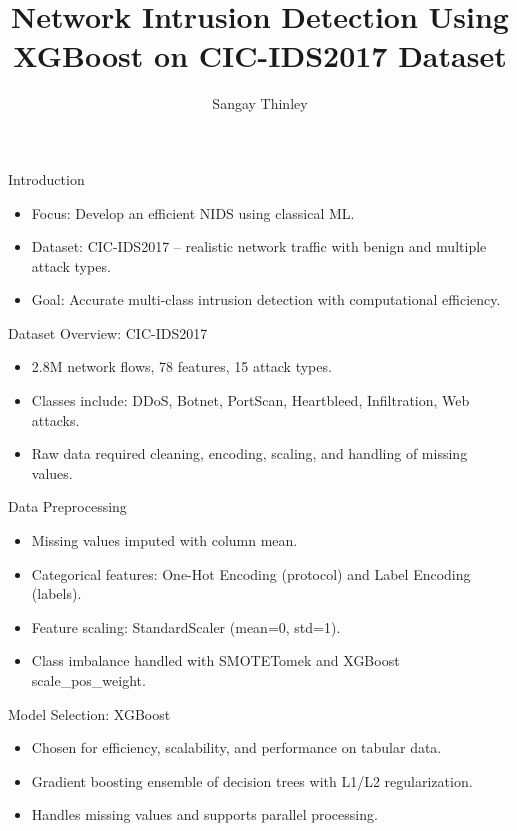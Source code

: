 \documentclass{beamer}
\title{Network Intrusion Detection Using XGBoost on CIC-IDS2017 Dataset}
\author{Sangay Thinley}
\institute{School of Built Environment, Engineering and Computing\\ Leeds Beckett University}
\date{}
\begin{document}
\frame{\titlepage}

\begin{frame}{Introduction}
\begin{itemize}
    \item Focus: Develop an efficient NIDS using classical ML.
    \item Dataset: CIC-IDS2017 – realistic network traffic with benign and multiple attack types.
    \item Goal: Accurate multi-class intrusion detection with computational efficiency.
\end{itemize}
\end{frame}

\begin{frame}{Dataset Overview: CIC-IDS2017}
\begin{itemize}
    \item 2.8M network flows, 78 features, 15 attack types.
    \item Classes include: DDoS, Botnet, PortScan, Heartbleed, Infiltration, Web attacks.
    \item Raw data required cleaning, encoding, scaling, and handling of missing values.
\end{itemize}
\end{frame}

\begin{frame}{Data Preprocessing}
\begin{itemize}
    \item Missing values imputed with column mean.
    \item Categorical features: One-Hot Encoding (protocol) and Label Encoding (labels).
    \item Feature scaling: StandardScaler (mean=0, std=1).
    \item Class imbalance handled with SMOTETomek and XGBoost scale\_pos\_weight.
\end{itemize}
\end{frame}

\begin{frame}{Model Selection: XGBoost}
\begin{itemize}
    \item Chosen for efficiency, scalability, and performance on tabular data.
    \item Gradient boosting ensemble of decision trees with L1/L2 regularization.
    \item Handles missing values and supports parallel processing.
\end{itemize}
\end{frame}
\end{document}
